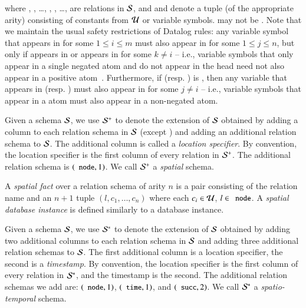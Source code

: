where , , \ldots, ,
, \ldots,  are relations in
$\schema$, and  and 
denote a tuple (of the appropriate arity) consisting of
constants from $\univ$ or variable symbols.   may not be \dedalus{<}.  Note that we maintain the usual safety
restrictions of Datalog rules: any variable symbol  that appears in
 for some $1 \leq i \leq m$ must also appear in
 for some $1 \leq j \leq n$, but only if 
appears in  or  appears in
 for some $k \neq i$ -- i.e., variable symbols that
only appear in a single negated atom and do not appear in the head need not also
appear in a positive atom~\cite{ullmanbook}.  Furthermore, if  (resp. ) is \dedalus{<}, then any variable that appears in  (resp. ) must also appear in  for some $j \neq i$ -- i.e., variable symbols that appear in a \dedalus{<} atom must also appear in a non-negated atom.


Given a schema $\schema$, we use
$\sschema$ to denote the extension of $\schema$ obtained by adding a column to
each relation schema in $\schema$ (except \dedalus{<}) and adding an additional relation schema to $\schema$.  The
additional column is called a {\em location specifier}.  
By convention, the location specifier is the first column of every relation in $\sschema$.  The
additional relation schema is $(\dedalus{node},1)$.
We call $\sschema$ a {\em spatial} schema.

A {\em spatial fact} over a relation schema of arity $n$ is a pair consisting of the relation name and an $n+1$ tuple $(l,c_1,\ldots,c_n)$ where each $c_i \in \univ$, $l \in \dedalus{node}$.  A {\em spatial database instance} is defined similarly to a database instance.

Given a schema $\schema$, we use $\stschema$ to denote the extension of
$\schema$ obtained by adding two additional columns to each relation schema in $\schema$ and adding three additional relation schemas to $\schema$. 
The first additional column is a location specifier, the second is a {\em timestamp}.  By convention, the location specifier is the first column of every relation in $\stschema$, and the timestamp is the second.  
The additional relation schemas we add are: $(\dedalus{node},1)$,
$(\dedalus{time},1)$, and $(\dedalus{succ},2)$.
We call $\stschema$ a {\em spatio-temporal} schema.

